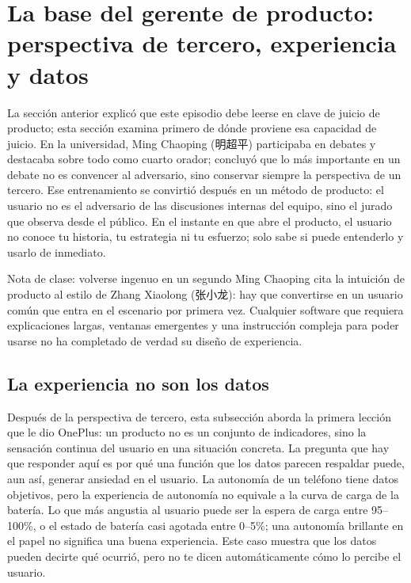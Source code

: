 \section{La base del gerente de producto: perspectiva de tercero, experiencia y datos}

La sección anterior explicó que este episodio debe leerse en clave de juicio de producto; esta sección examina primero de dónde proviene esa capacidad de juicio. En la universidad, Ming Chaoping (明超平) participaba en debates y destacaba sobre todo como cuarto orador; concluyó que lo más importante en un debate no es convencer al adversario, sino conservar siempre la perspectiva de un tercero. Ese entrenamiento se convirtió después en un método de producto: el usuario no es el adversario de las discusiones internas del equipo, sino el jurado que observa desde el público. En el instante en que abre el producto, el usuario no conoce tu historia, tu estrategia ni tu esfuerzo; solo sabe si puede entenderlo y usarlo de inmediato.

\begin{importantbox}{Nota de clase: volverse ingenuo en un segundo}
Ming Chaoping cita la intuición de producto al estilo de Zhang Xiaolong (张小龙): hay que convertirse en un usuario común que entra en el escenario por primera vez. Cualquier software que requiera explicaciones largas, ventanas emergentes y una instrucción compleja para poder usarse no ha completado de verdad su diseño de experiencia.
\end{importantbox}

\subsection{La experiencia no son los datos}

Después de la perspectiva de tercero, esta subsección aborda la primera lección que le dio OnePlus: un producto no es un conjunto de indicadores, sino la sensación continua del usuario en una situación concreta. La pregunta que hay que responder aquí es por qué una función que los datos parecen respaldar puede, aun así, generar ansiedad en el usuario. La autonomía de un teléfono tiene datos objetivos, pero la experiencia de autonomía no equivale a la curva de carga de la batería. Lo que más angustia al usuario puede ser la espera de carga entre 95--100\%, o el estado de batería casi agotada entre 0--5\%; una autonomía brillante en el papel no significa una buena experiencia. Este caso muestra que los datos pueden decirte qué ocurrió, pero no te dicen automáticamente cómo lo percibe el usuario.

